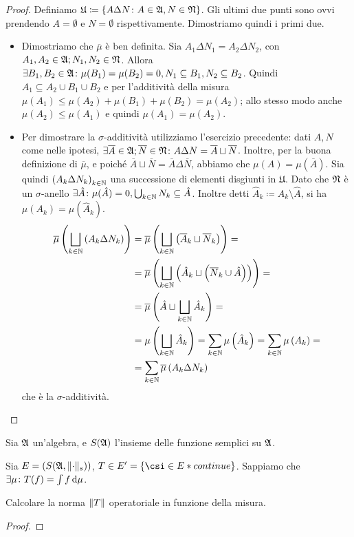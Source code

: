 \documentclass[../EserciziIstituzioniAnalisi.tex]{subfiles}
\begin{document}
\begin{proof}
  Definiamo $\mathfrak{U}\coloneqq \left\{A\Delta N\colon A\in\mathfrak A,N\in\mathfrak N\right\}$. Gli ultimi due punti sono ovvi prendendo $A=\emptyset$ e $N=\emptyset$ rispettivamente. Dimostriamo quindi i primi due.
  \begin{itemize}
    \item Dimostriamo che $\overline\mu$ è ben definita. Sia $A_1 \Delta N_1=A_2\Delta N_2$, con $A_1,A_2\in \mathfrak A; N_1,N_2\in\mathfrak N$. Allora $\exists B_1, B_2\in \mathfrak A\colon \mu(B_1)=\mu(B_2)=0, N_1\subseteq B_1, N_2\subseteq B_2$. Quindi $A_1\subseteq A_2\cup B_1 \cup B_2$ e per l'additività della misura $\mu(A_1)\leq \mu(A_2)+\mu(B_1)+\mu(B_2)=\mu(A_2)$; allo stesso modo anche $\mu(A_2)\leq \mu(A_1)$ e quindi $\mu(A_1)=\mu(A_2)$.
    \item Per dimostrare la $\sigma$-additività utilizziamo l'esercizio precedente: dati $A,N$ come nelle ipotesi, $\exists \overline A\in \mathfrak A; \overline N\in\mathfrak N \colon A \Delta N= \overline A \sqcup \overline N$. Inoltre, per la buona definizione di $\overline \mu$, e poiché $\overline A \sqcup \overline N=\overline A \Delta \overline N$, abbiamo che $\mu(A)=\mu(\overline A)$. Sia quindi $\left(A_k \Delta N_k \right)_{k\in \mathbb N}$ una successione di elementi disgiunti in $\mathfrak{U}$. Dato che $\mathfrak N$ è un $\sigma$-anello $\exists \hat A\colon \mu(\hat A)=0, \bigcup_{k \in \mathbb N} N_k\subseteq \hat A$. Inoltre detti $\hat A_k\coloneqq A_k \setminus \hat A$, si ha $\mu(A_k)=\mu(\hat A_k)$.
    \begin{equation*}
      \begin{aligned}
        \overline \mu\left(\bigsqcup_{k\in \mathbb N} \left( A_k \Delta N_k\right)\right)&=\overline \mu\left(\bigsqcup_{k\in \mathbb N} \left(\overline A_k \sqcup \overline N_k\right)\right)=\\
        &=\overline \mu\left(\bigsqcup_{k\in \mathbb N} \left(\hat A_k \sqcup \left(\overline N_k \cup\hat A \right)\right)\right)=\\
        &=\overline \mu\left(\hat A \sqcup \bigsqcup_{k\in \mathbb N} \hat A_k \right)=\\
        &=\mu\left(\bigsqcup_{k\in \mathbb N} \hat A_k\right)=\sum_{k \in \mathbb N}\mu\left(\hat A_k\right)=\sum_{k \in \mathbb N}\mu\left(A_k\right)=\\
        &=\sum_{k \in \mathbb N}\overline\mu\left(A_k \Delta N_k\right)
      \end{aligned}
    \end{equation*}
    che è la $\sigma$-additività.
  \end{itemize}
\end{proof}

\begin{exercise}[14/10/2016]
  Sia $\mathfrak A$ un'algebra, e $S(\mathfrak A)$ l'insieme delle funzione semplici su $\mathfrak A$.
  
  Sia $E=\left(S(\mathfrak A,\lVert\cdot\rVert_s)\right)$, $T\in E'=\{\csi \in E* continue\}$.
  Sappiamo che $\exists \mu\colon T(f)=\int f \,\mathrm d \mu$.
  
  Calcolare la norma $\lVert T\rVert$ operatoriale in funzione della misura.
\end{exercise}
\begin{proof}
  
\end{proof}
\end{document}
